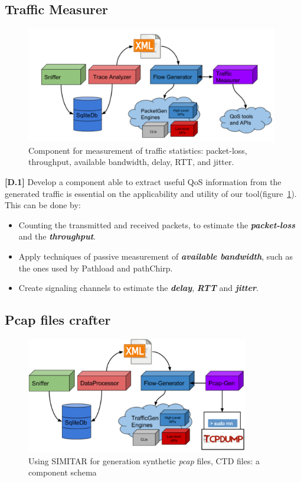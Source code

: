 \subsection{Traffic Measurer}

\begin{figure}[!ht]
    \centering
    \includegraphics[height=2.0in]{figures/ch6/traffic-measurer}
    \caption{Component for measurement of traffic statistics: packet-loss, throughput, available bandwidth, delay, RTT, and jitter.}
    \label{fig:traffic-measurer}
\end{figure}


\textbf{[D.1]} Develop a component able to extract useful QoS information from the generated traffic is essential on the applicability and utility of our tool(figure~\ref{fig:traffic-measurer}). This can be done by:
\begin{itemize}
\item Counting the transmitted and received packets, to estimate the \textit{\textbf{packet-loss}} and the \textit{\textbf{throughput}}.
\item Apply techniques of passive measurement of \textit{\textbf{available bandwidth}}, such as the ones used by Pathload\cite{web-pathload} and pathChirp\cite{pathchirp-paper}\cite{web-pathchirp}.
\item Create signaling channels to estimate the \textit{\textbf{delay}}, \textit{\textbf{RTT}} and \textit{\textbf{jitter}}. 
\end{itemize}

\subsection{Pcap files crafter}

\begin{figure}[!ht]
    \centering
    \includegraphics[height=2.0in]{figures/ch6/pcap-gen}
    \caption{Using SIMITAR for generation synthetic \textit{pcap} files, CTD files: a component schema}
    \label{fig:pcap-gen}
\end{figure}


